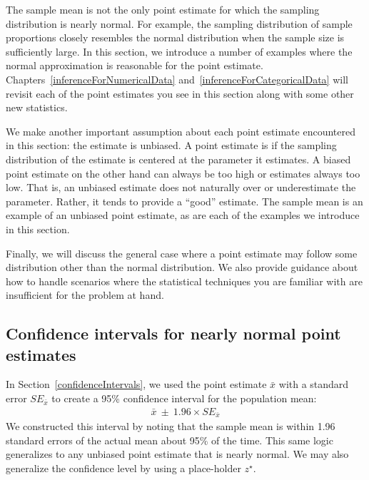 The sample mean is not the only point estimate for which the sampling distribution is nearly normal. For example, the sampling distribution of sample proportions closely resembles the normal distribution when the sample size is sufficiently large. In this section, we introduce a number of examples where the normal approximation is reasonable for the point estimate. Chapters~\ref{inferenceForNumericalData} and~\ref{inferenceForCategoricalData} will revisit each of the point estimates you see in this section along with some other new statistics.

We make another important assumption about each point estimate encountered in this section: the estimate is unbiased. A point estimate is  if the sampling distribution of the estimate is centered at the parameter it estimates. A biased point estimate on the other hand can always be too high or estimates always too low. That is, an unbiased estimate does not naturally over or underestimate the parameter. Rather, it tends to provide a ``good'' estimate. The sample mean is an example of an unbiased point estimate, as are each of the examples we introduce in this section.

Finally, we will discuss the general case where a point estimate may follow some distribution other than the normal distribution. We also provide guidance about how to handle scenarios where the statistical techniques you are familiar with are insufficient for the problem at hand.

\subsection{Confidence intervals for nearly normal point estimates}


In Section~\ref{confidenceIntervals}, we used the point estimate $\bar{x}$ with a standard error $SE_{\bar{x}}$ to create a 95\% confidence interval for the population mean:
\begin{align}
\bar{x}\ \pm\ 1.96 \times SE_{\bar{x}}
\label{95PercCIForMeanInGeneralizingSection}
\end{align}
We constructed this interval by noting that the sample mean is within 1.96 standard errors of the actual mean about 95\% of the time. This same logic generalizes to any unbiased point estimate that is nearly normal. We may also generalize the confidence level by using a place-holder $z^{\star}$.

